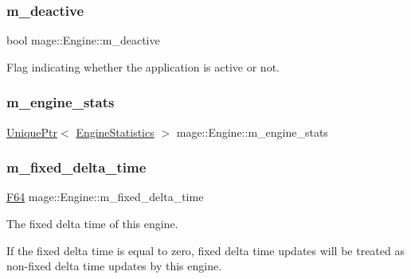 \subsubsection{\texorpdfstring{m\+\_\+deactive}{m\_deactive}}
{\footnotesize\ttfamily bool mage\+::\+Engine\+::m\+\_\+deactive\hspace{0.3cm}{\ttfamily [private]}}

Flag indicating whether the application is active or not. \hypertarget{classmage_1_1_engine_aa0c82f248a2fbec3fbf778665a440edc}{}\label{classmage_1_1_engine_aa0c82f248a2fbec3fbf778665a440edc} 
\subsubsection{\texorpdfstring{m\+\_\+engine\+\_\+stats}{m\_engine\_stats}}
{\footnotesize\ttfamily \hyperlink{namespacemage_a3316d7143a973e37adf1110f2e80ca31}{Unique\+Ptr}$<$ \hyperlink{structmage_1_1_engine_statistics}{Engine\+Statistics} $>$ mage\+::\+Engine\+::m\+\_\+engine\+\_\+stats\hspace{0.3cm}{\ttfamily [private]}}

\hypertarget{classmage_1_1_engine_a95557e1b6cba52b393c94d80d80bea4c}{}\label{classmage_1_1_engine_a95557e1b6cba52b393c94d80d80bea4c} 
\subsubsection{\texorpdfstring{m\+\_\+fixed\+\_\+delta\+\_\+time}{m\_fixed\_delta\_time}}
{\footnotesize\ttfamily \hyperlink{namespacemage_ad26233bbec640deda836e572c1a23708}{F64} mage\+::\+Engine\+::m\+\_\+fixed\+\_\+delta\+\_\+time\hspace{0.3cm}{\ttfamily [private]}}

The fixed delta time of this engine.

If the fixed delta time is equal to zero, fixed delta time updates will be treated as non-\/fixed delta time updates by this engine. \hypertarget{classmage_1_1_engine_a8e9048208a6a5c5b034aaa1cbdab28bc}{}\label{classmage_1_1_engine_a8e9048208a6a5c5b034aaa1cbdab28bc} 

